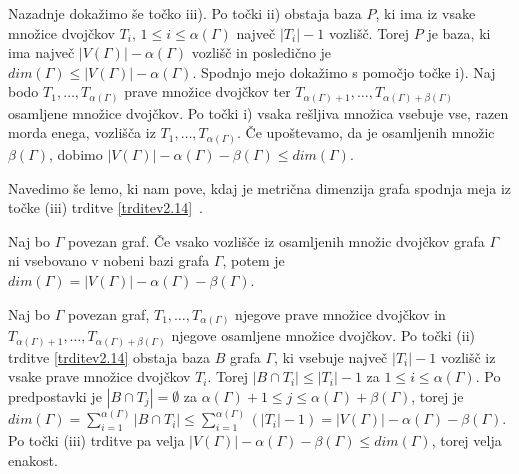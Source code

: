\documentclass[mat1, tisk]{fmfdelo}
\begin{document}
\begin{dokaz}
  Nazadnje dokažimo še točko iii). Po točki ii) obstaja baza $P$, ki ima iz vsake 
  množice dvojčkov $T_i$, $1 \leq i \leq \alpha(\Gamma)$ največ $|T_i| - 1$ vozlišč. 
  Torej $P$ je baza, ki ima največ $|V(\Gamma)| - \alpha(\Gamma)$ vozlišč in 
  posledično je $dim(\Gamma) \leq |V(\Gamma)| - \alpha(\Gamma)$. Spodnjo mejo dokažimo s 
  pomočjo točke i). Naj bodo $T_1, \ldots, T_{\alpha(\Gamma)}$ prave množice dvojčkov ter 
  $T_{\alpha(\Gamma)+1}, \ldots, T_{\alpha(\Gamma)+\beta(\Gamma)}$ osamljene množice dvojčkov. 
  Po točki i) vsaka rešljiva množica vsebuje vse, razen morda enega, vozlišča iz 
  $T_1, \ldots, T_{\alpha(\Gamma)}$. Če upoštevamo, da je osamljenih množic $\beta(\Gamma)$, 
  dobimo $|V(\Gamma)| - \alpha(\Gamma) - \beta(\Gamma) \leq dim(\Gamma)$.
\end{dokaz}
%
Navedimo še lemo, ki nam pove, kdaj je metrična dimenzija grafa spodnja meja iz 
točke (iii) trditve \ref{trditev2.14}~\cite{0OuSh}.
%
\begin{lema}\label{lema2.15}
  Naj bo $\Gamma$ povezan graf. Če vsako vozlišče iz osamljenih množic dvojčkov 
  grafa $\Gamma$ ni vsebovano v nobeni bazi grafa $\Gamma$, potem je 
  $dim(\Gamma) = |V(\Gamma)| - \alpha(\Gamma) - \beta(\Gamma)$.
\end{lema}
\begin{dokaz}
  Naj bo $\Gamma$ povezan graf, $T_1, \ldots, T_{\alpha(\Gamma)}$ njegove prave množice dvojčkov in 
  $T_{\alpha(\Gamma)+1}, \ldots, T_{\alpha(\Gamma)+\beta(\Gamma)}$ njegove osamljene množice 
  dvojčkov. Po točki (ii) trditve \ref{trditev2.14} obstaja 
  baza $B$ grafa $\Gamma$, ki vsebuje največ $|T_i| - 1$ vozlišč 
  iz vsake prave množice dvojčkov $T_i$. Torej $|B \cap T_i| \leq |T_i| - 1$ 
  za $1 \leq i \leq \alpha(\Gamma)$. Po predpostavki je $|B \cap T_j| = \emptyset$ 
  za $\alpha(\Gamma) + 1 \leq j \leq \alpha(\Gamma) + \beta(\Gamma)$, torej je 
  $dim(\Gamma) = \sum\limits_{i=1}^{\alpha(\Gamma)} |B \cap T_i| \leq 
  \sum\limits_{i=1}^{\alpha(\Gamma)} (|T_i| - 1) = |V(\Gamma)| - \alpha(\Gamma) - \beta(\Gamma)$. 
  Po točki (iii) trditve pa velja $|V(\Gamma)| - \alpha(\Gamma) - \beta(\Gamma) \leq dim(\Gamma)$, 
  torej velja enakost.
\end{dokaz}
%
%
%
\end{document}
